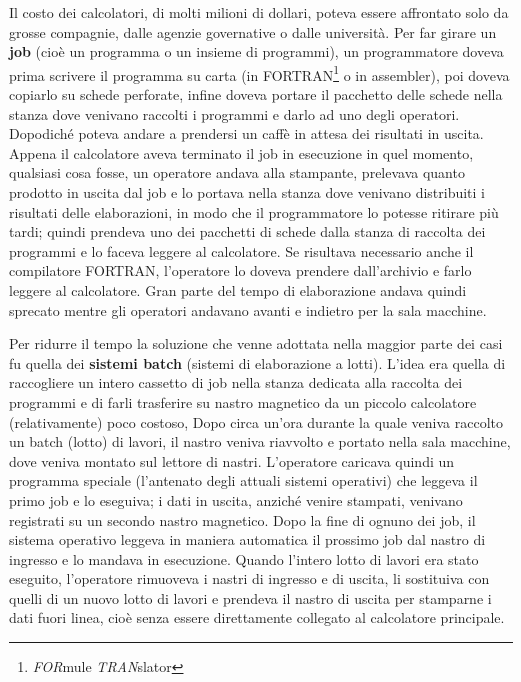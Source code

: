 Il costo dei calcolatori, di molti milioni di dollari, poteva essere affrontato solo da grosse compagnie, dalle agenzie governative o dalle università. Per far girare un \textbf{job} (cioè un programma o un insieme di programmi), un programmatore doveva prima scrivere il
programma su carta (in FORTRAN\footnote{\textit{FOR}mule \textit{TRAN}slator} o in assembler), poi doveva copiarlo su schede perforate, infine doveva portare il pacchetto delle schede nella stanza dove venivano raccolti i programmi e darlo ad uno degli operatori. Dopodiché poteva andare a prendersi un caffè in attesa dei risultati in uscita. Appena il calcolatore aveva terminato il job in esecuzione in quel momento, qualsiasi cosa fosse, un operatore andava alla stampante, prelevava quanto prodotto in uscita dal job e lo portava nella stanza dove venivano distribuiti i risultati delle elaborazioni, in modo che il programmatore lo potesse ritirare più tardi; quindi prendeva uno dei pacchetti di schede dalla stanza di raccolta dei programmi e lo faceva leggere al calcolatore.  Se risultava necessario anche il compilatore FORTRAN, l'operatore lo doveva prendere dall'archivio e farlo leggere al calcolatore. Gran parte del tempo di elaborazione andava quindi sprecato mentre gli operatori andavano avanti e indietro per la sala macchine.

Per ridurre il tempo la soluzione che venne adottata nella maggior parte dei casi fu quella dei \textbf{sistemi batch} (sistemi di elaborazione a lotti). L'idea era quella di raccogliere un intero cassetto di job nella stanza dedicata alla raccolta dei programmi e di farli trasferire su nastro magnetico da un piccolo calcolatore (relativamente) poco costoso,
Dopo circa un'ora durante la quale veniva raccolto un batch (lotto) di lavori, il nastro veniva riavvolto e portato nella sala macchine, dove veniva montato sul lettore di nastri. L'operatore caricava quindi un programma speciale (l'antenato degli attuali sistemi operativi) che leggeva il primo job e lo eseguiva; i dati in uscita, anziché venire stampati, venivano registrati su un secondo nastro magnetico. Dopo la fine di ognuno dei job, il sistema operativo leggeva in maniera automatica il prossimo job dal nastro di ingresso e lo mandava in esecuzione. Quando l'intero lotto di lavori era stato eseguito, l'operatore rimuoveva i nastri di ingresso e di uscita, li sostituiva con quelli di un nuovo lotto di lavori e prendeva il nastro di uscita per stamparne i dati fuori linea, cioè senza essere direttamente collegato al calcolatore principale.

